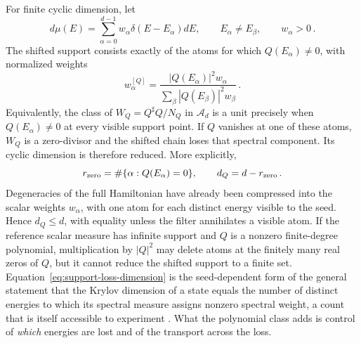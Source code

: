 \documentclass[a4paper,11pt]{article}
\def\dd{d}%
\theoremstyle{definition}
\theoremstyle{remark}
\newcommand{\dd}{\mathrm d}
\newcommand{\cA}{\mathcal A}
\newcommand{\Qsh}{Q^{\sharp}}
\begin{document}
For finite cyclic dimension, let
\begin{equation}
   \dd\mu(E)
   =
   \sum_{\alpha=0}^{d-1}
   w_\alpha\delta(E-E_\alpha)\dd E,
   \qquad
   E_\alpha\ne E_\beta,\qquad
   w_\alpha>0\,.
\end{equation}
The shifted support consists exactly of the atoms for which
$Q(E_\alpha)\ne0$, with normalized weights
\begin{equation}
   w_\alpha^{[Q]}
   =
   \frac{|Q(E_\alpha)|^2w_\alpha}
   {\sum_\beta|Q(E_\beta)|^2w_\beta}\,.
   \label{eq:finite-shifted-weights-main}
\end{equation}
Equivalently, the class of
$W_Q=\Qsh Q/N_Q$ in $\cA_d$ is a unit precisely when
$Q(E_\alpha)\ne0$ at every visible support point. If $Q$ vanishes at one of these atoms, $W_Q$ is a zero-divisor and the shifted chain loses that spectral component. Its cyclic dimension is therefore reduced. More explicitly,
\begin{equation}
   r_{\rm zero}
   =
   \#\{\alpha:Q(E_\alpha)=0\},
   \qquad
   d_Q=d-r_{\rm zero}\,.
   \label{eq:support-loss-dimension}
\end{equation}
Degeneracies of the full Hamiltonian have already been compressed into the scalar weights $w_\alpha$, with one atom for each distinct energy visible to the seed. Hence $d_Q\le d$, with equality unless the filter annihilates a visible atom. If the reference scalar measure has infinite support and $Q$ is a nonzero finite-degree polynomial, multiplication by $|Q|^2$ may delete atoms at the finitely many real zeros of $Q$, but it cannot reduce the shifted support to a finite set.
Equation~\eqref{eq:support-loss-dimension} is the seed-dependent form of the general
statement that the Krylov dimension of a state equals the number of distinct energies to which its spectral measure assigns nonzero spectral weight, a count that is itself accessible to experiment \cite{CindrakEtAl2024}. What the polynomial
class adds is control of \emph{which} energies are lost and of the transport across the loss.
\end{document}
